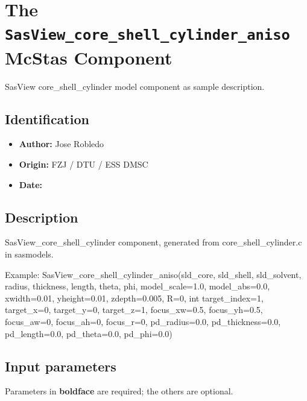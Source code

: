 \section{The \texttt{SasView\_core\_shell\_cylinder\_aniso} McStas Component}
SasView core\_shell\_cylinder model component as sample description.

\subsection*{Identification}
\begin{itemize}
  \item \textbf{Author:} Jose Robledo
  \item \textbf{Origin:} FZJ / DTU / ESS DMSC
  \item \textbf{Date:} 
\end{itemize}

\subsection*{Description}
SasView\_core\_shell\_cylinder component, generated from core\_shell\_cylinder.c in sasmodels.

Example: SasView\_core\_shell\_cylinder\_aniso(sld\_core, sld\_shell, sld\_solvent, radius, thickness, length, theta, phi, model\_scale=1.0, model\_abs=0.0, xwidth=0.01, yheight=0.01, zdepth=0.005, R=0, int target\_index=1, target\_x=0, target\_y=0, target\_z=1, focus\_xw=0.5, focus\_yh=0.5, focus\_aw=0, focus\_ah=0, focus\_r=0, pd\_radius=0.0, pd\_thickness=0.0, pd\_length=0.0, pd\_theta=0.0, pd\_phi=0.0)

\subsection*{Input parameters}
Parameters in \textbf{boldface} are required; the others are optional.

